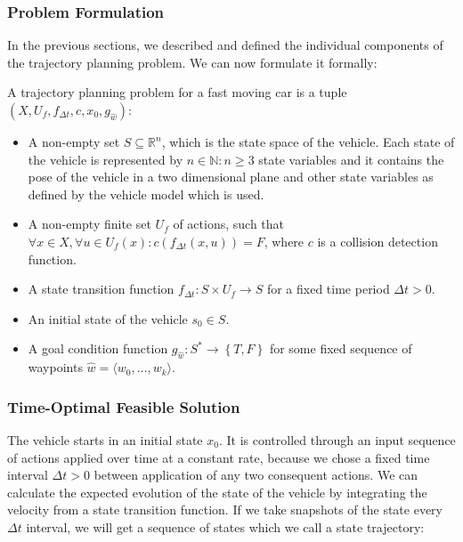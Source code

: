 

\subsubsection{Problem Formulation}

In the previous sections, we described and defined the individual components of the trajectory planning problem. We can now formulate it formally:

\begin{defn}

	A trajectory planning problem for a fast moving car is a tuple $\left(X, U_f, f_{\Delta t}, c, x_0, g_{\hat{w}}\right)$:

	\begin{itemize}
		\item A non-empty set $S\subseteq\mathbb{R}^n$, which is the state space of the vehicle. Each state of the vehicle is represented by $n\in\mathbb{N}:n\geq3$ state variables and it contains the pose of the vehicle in a two dimensional plane and other state variables as defined by the vehicle model which is used.

		\item A non-empty finite set $U_f$ of actions, such that $\forall x\in X, \forall u\in U_f(x): c(f_{\Delta t}(x, u)) = F$, where $c$ is a collision detection function.

		\item A state transition function $f_{\Delta t}:S\times U_f \rightarrow S$ for a fixed time period $\Delta t>0$.
		
		\item An initial state of the vehicle $s_0 \in S$.

		\item A goal condition function $g_{\hat{w}}: S^* \rightarrow \left\{ T, F\right\}$ for some fixed sequence of waypoints $\hat{w}=\langle w_0, \ldots, w_k \rangle$.
	\end{itemize}
\end{defn}

\subsubsection{Time-Optimal Feasible Solution}

The vehicle starts in an initial state $x_0$. It is controlled through an input sequence of actions applied over time at a constant rate, because we chose a fixed time interval $\Delta t>0$ between application of any two consequent actions. We can calculate the expected evolution of the state of the vehicle by integrating the velocity from a state transition function. If we take snapshots of the state every $\Delta t$ interval, we will get a sequence of states which we call a state trajectory:

